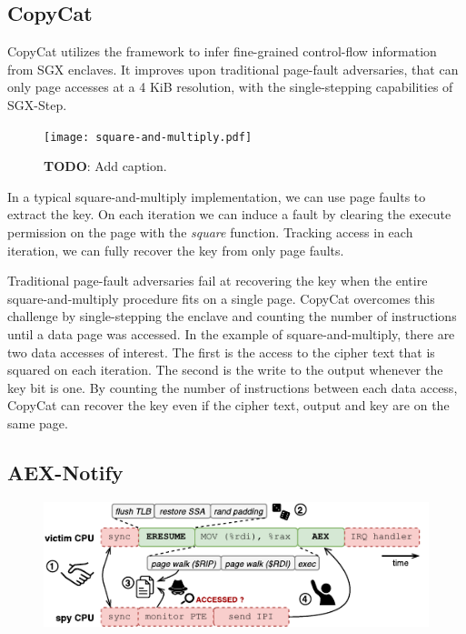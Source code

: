 \documentclass{llncs}
\begin{document}

\subsection{CopyCat}

CopyCat \cite{MoghimiBHPS20} utilizes the framework
to infer fine-grained control-flow information from SGX enclaves.
It improves upon traditional page-fault adversaries,
that can only page accesses at a 4 KiB resolution,
with the single-stepping capabilities of SGX-Step.

\begin{figure}[t]
  \centering
  \texttt{[image: square-and-multiply.pdf]}
  \caption{\textbf{TODO}: Add caption.}
  \label{fig:square-and-multiply}
\end{figure}

In a typical square-and-multiply implementation,
we can use page faults to extract the key.
On each iteration we can induce a fault by clearing the execute permission on
the page with the \emph{square} function.
Tracking access in each iteration, we can fully recover the key from only page faults.

Traditional page-fault adversaries fail at recovering the key when the entire
square-and-multiply procedure fits on a single page.
CopyCat overcomes this challenge by single-stepping the enclave and counting the
number of instructions until a data page was accessed.
In the example of square-and-multiply, there are two data accesses of interest.
The first is the access to the cipher text that is squared on each iteration.
The second is the write to the output whenever the key bit is one.
By counting the number of instructions between each data access,
CopyCat can recover the key even if the cipher text, output and key are on the same page.


\subsection{AEX-Notify}
\label{sec:aex-notify}

\begin{figure}[t]
  \centering
  \includegraphics{images/sgx-step-pte.pdf}
  \caption{}
  \label{fig:sgx-step-pte}
\end{figure}
\end{document}
